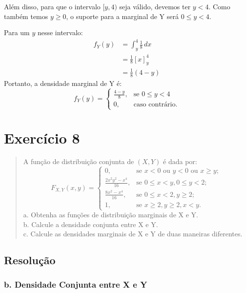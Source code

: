 \documentclass[12pt]{article}
\begin{document}
Além disso, para que o intervalo $[y, 4)$ seja válido, devemos ter $y < 4$. Como também temos $y \ge 0$, o suporte para a marginal de Y será $0 \le y < 4$.

Para um $y$ nesse intervalo:
\begin{align*}
f_Y(y) &= \int_{y}^{4} \frac{1}{8} \,dx \\
&= \frac{1}{8} [x]_{y}^{4} \\
&= \frac{1}{8} (4 - y)
\end{align*}
Portanto, a densidade marginal de Y é:
\[ f_Y(y) = \begin{cases} \frac{4-y}{8}, & \text{se } 0 \le y < 4 \\ 0, & \text{caso contrário.} \end{cases} \]
\hfill \qedsymbol

\section{Exercício 8}

\begin{quote}
A função de distribuição conjunta de $(X,Y)$ é dada por:
\[ F_{X,Y}(x,y) = \begin{cases} 0, & \text{se } x < 0 \text{ ou } y < 0 \text{ ou } x \ge y; \\ \frac{2x^2y^2-x^4}{16}, & \text{se } 0 \le x < y, 0 \le y < 2; \\ \frac{8x^2-x^4}{16}, & \text{se } 0 \le x < 2, y \ge 2; \\ 1, & \text{se } x \ge 2, y \ge 2, x < y. \end{cases} \]
a. Obtenha as funções de distribuição marginais de X e Y. \\
b. Calcule a densidade conjunta entre X e Y. \\
c. Calcule as densidades marginais de X e Y de duas maneiras diferentes.
\end{quote}

\subsection*{Resolução}

\subsubsection*{b. Densidade Conjunta entre X e Y}
\end{document}
